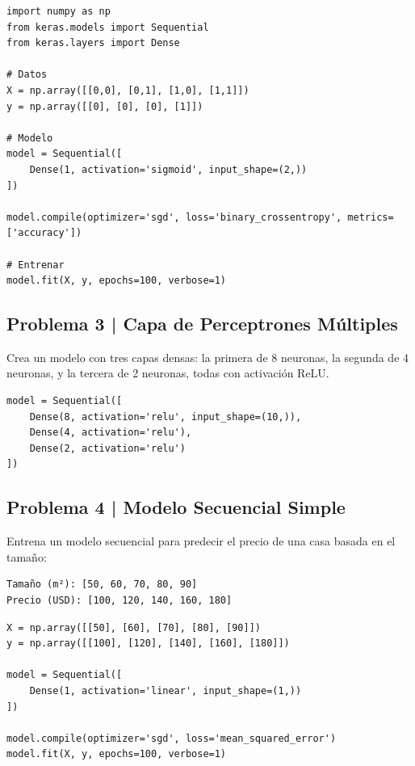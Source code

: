 \documentclass{article}
\begin{document}
\begin{lstlisting}[style=python]
import numpy as np
from keras.models import Sequential
from keras.layers import Dense

# Datos
X = np.array([[0,0], [0,1], [1,0], [1,1]])
y = np.array([[0], [0], [0], [1]])

# Modelo
model = Sequential([
    Dense(1, activation='sigmoid', input_shape=(2,))
])

model.compile(optimizer='sgd', loss='binary_crossentropy', metrics=['accuracy'])

# Entrenar
model.fit(X, y, epochs=100, verbose=1)
\end{lstlisting}

\clearpage

\subsection*{Problema 3 | Capa de Perceptrones Múltiples}

Crea un modelo con tres capas densas: la primera de 8 neuronas, la segunda de 4 neuronas, y la tercera de 2 neuronas, todas con activación ReLU.

\begin{lstlisting}[style=python]
model = Sequential([
    Dense(8, activation='relu', input_shape=(10,)),
    Dense(4, activation='relu'),
    Dense(2, activation='relu')
])
\end{lstlisting}

\clearpage

\subsection*{Problema 4 | Modelo Secuencial Simple}

Entrena un modelo secuencial para predecir el precio de una casa basada en el tamaño:

\begin{verbatim}
Tamaño (m²): [50, 60, 70, 80, 90]
Precio (USD): [100, 120, 140, 160, 180]
\end{verbatim}

\begin{lstlisting}[style=python]
X = np.array([[50], [60], [70], [80], [90]])
y = np.array([[100], [120], [140], [160], [180]])

model = Sequential([
    Dense(1, activation='linear', input_shape=(1,))
])

model.compile(optimizer='sgd', loss='mean_squared_error')
model.fit(X, y, epochs=100, verbose=1)
\end{lstlisting}
\end{document}
